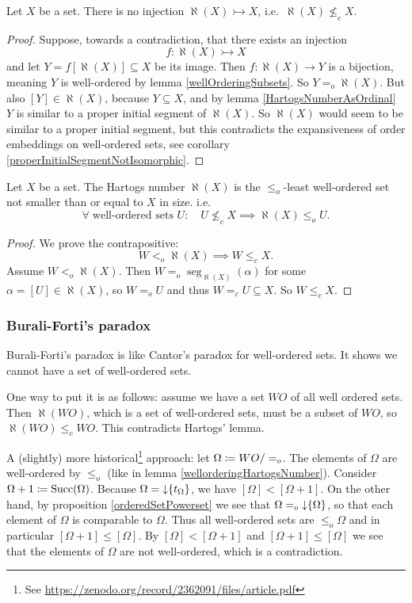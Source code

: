 \begin{theorem} \label{HartogsLemma}
Let $X$ be a set. There is no injection $\aleph(X) \rightarrowtail X$, i.e.\ $\aleph(X) \nleq_c X$.
\end{theorem}
\begin{proof}
Suppose, towards a contradiction, that there exists an injection
\[ f: \aleph(X) \rightarrowtail X \]
and let $Y = f[\aleph(X)] \subseteq X$ be its image. Then $f: \aleph(X) \to Y$ is a bijection, meaning $Y$ is well-ordered by lemma \ref{wellOrderingSubsets}. So $Y =_o \aleph(X)$.
But also $[Y]\in \aleph(X)$, because $Y\subseteq X$, and by lemma \ref{HartogsNumberAsOrdinal} $Y$ is similar to a proper initial segment of $\aleph(X)$.
So $\aleph(X)$ would seem to be similar to a proper initial segment, but this contradicts the expansiveness of order embeddings on well-ordered sets, see corollary \ref{properInitialSegmentNotIsomorphic}.
\end{proof}


\begin{proposition} \label{proposition:HartogsLeast}
Let $X$ be a set. The Hartogs number $\aleph(X)$ is the $\leq_o$-least well-ordered set not smaller than or equal to $X$ in size. i.e.\
\[ \forall \;\text{well-ordered sets $U$}:\quad U \nleq_c X \implies \aleph(X)\leq_o U. \]
\end{proposition}
\begin{proof}
We prove the contrapositive:
\[ W <_o \aleph(X) \implies W \leq_c X. \]
Assume $W <_o \aleph(X)$. Then $W =_o \operatorname{seg}_{\aleph(X)}(\alpha)$ for some $\alpha = [U]\in \aleph(X)$, so $W=_o U$ and thus $W =_c U \subseteq X$. So $W\leq_c X$.
\end{proof}

\subsubsection{Burali-Forti's paradox}
Burali-Forti's paradox is like Cantor's paradox for well-ordered sets. It shows we cannot have a set of well-ordered sets.

One way to put it is as follows: assume we have a set $WO$ of all well ordered sets. Then $\aleph(WO)$, which is a set of well-ordered sets, must be a subset of $WO$, so $\aleph(WO) \leq_c WO$. This contradicts Hartogs' lemma.

A (slightly) more historical\footnote{See \url{https://zenodo.org/record/2362091/files/article.pdf}} approach: let $\Omega \coloneqq WO/=_o$.
The elements of $\Omega$ are well-ordered by $\leq_o$ (like in lemma \ref{wellorderingHartogsNumber}).
Consider $\Omega+1 \coloneqq \operatorname{Succ}(\Omega)$. Because $\Omega = \operatorname{\downarrow}\{t_\Omega\}$, we have $[\Omega] < [\Omega +1]$.
On the other hand, by proposition \ref{orderedSetPowerset} we see that $\Omega =_o \operatorname{\downarrow}\{\Omega\}$, so that each element of $\Omega$ is comparable to $\Omega$.
Thus all well-ordered sets are $\leq_o \Omega$ and in particular $[\Omega + 1] \leq [\Omega]$. By $[\Omega] < [\Omega +1]$ and $[\Omega + 1] \leq [\Omega]$ we see that the elements of $\Omega$ are not well-ordered, which is a contradiction.

